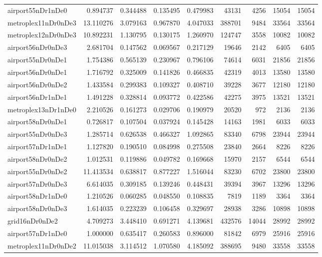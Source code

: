 \documentclass[../../../thesis.tex]{subfiles}
\begin{document}
\begin{longtable}{|l|r|r|r|r|r|r|r|r|}
airport55nDr1nDe0 & 0.894737 & 0.344488 & 0.135495 & 0.479983 & 43131 & 4256 & 15054 & 15054 \\
metroplex11nDr0nDe3 & 13.110276 & 3.079163 & 0.967870 & 4.047033 & 388701 & 9484 & 33564 & 33564 \\
metroplex12nDr0nDe3 & 10.892231 & 1.130795 & 0.130175 & 1.260970 & 124747 & 3558 & 10082 & 10082 \\
airport56nDr0nDe3 & 2.681704 & 0.147562 & 0.069567 & 0.217129 & 19646 & 2142 & 6405 & 6405 \\
airport55nDr0nDe1 & 1.754386 & 0.565139 & 0.230967 & 0.796106 & 74614 & 6031 & 21856 & 21856 \\
airport56nDr0nDe1 & 1.716792 & 0.325009 & 0.141826 & 0.466835 & 42319 & 4013 & 13580 & 13580 \\
airport56nDr0nDe2 & 1.433584 & 0.299383 & 0.109327 & 0.408710 & 39228 & 3677 & 12180 & 12180 \\
airport56nDr1nDe1 & 1.491228 & 0.328814 & 0.093772 & 0.422586 & 42275 & 3975 & 13521 & 13521 \\
metroplex13nDr1nDe0 & 2.210526 & 0.161273 & 0.029706 & 0.190979 & 20520 & 972 & 2136 & 2136 \\
airport58nDr0nDe1 & 0.726817 & 0.107504 & 0.037924 & 0.145428 & 14163 & 1981 & 6033 & 6033 \\
airport55nDr0nDe3 & 1.285714 & 0.626538 & 0.466327 & 1.092865 & 83340 & 6798 & 23944 & 23944 \\
airport57nDr1nDe1 & 1.127820 & 0.190510 & 0.084998 & 0.275508 & 23840 & 2664 & 8226 & 8226 \\
airport58nDr0nDe2 & 1.012531 & 0.119886 & 0.049782 & 0.169668 & 15970 & 2157 & 6544 & 6544 \\
airport55nDr0nDe2 & 11.413534 & 0.638817 & 0.877227 & 1.516044 & 83230 & 6702 & 23800 & 23800 \\
airport57nDr0nDe3 & 6.614035 & 0.309185 & 0.139246 & 0.448431 & 39394 & 3967 & 13296 & 13296 \\
airport58nDr1nDe0 & 1.210526 & 0.060285 & 0.048550 & 0.108835 & 7819 & 1189 & 3364 & 3364 \\
airport58nDr0nDe3 & 1.614035 & 0.223239 & 0.106458 & 0.329697 & 28938 & 3286 & 10898 & 10898 \\
grid16nDr0nDe2 & 4.709273 & 3.448410 & 0.691271 & 4.139681 & 432576 & 14044 & 28992 & 28992 \\
airport57nDr1nDe0 & 1.000000 & 0.635417 & 0.260583 & 0.896000 & 81842 & 6979 & 25916 & 25916 \\
metroplex11nDr0nDe2 & 11.015038 & 3.114512 & 1.070580 & 4.185092 & 388695 & 9480 & 33558 & 33558 \\

\end{longtable}
\end{document}
